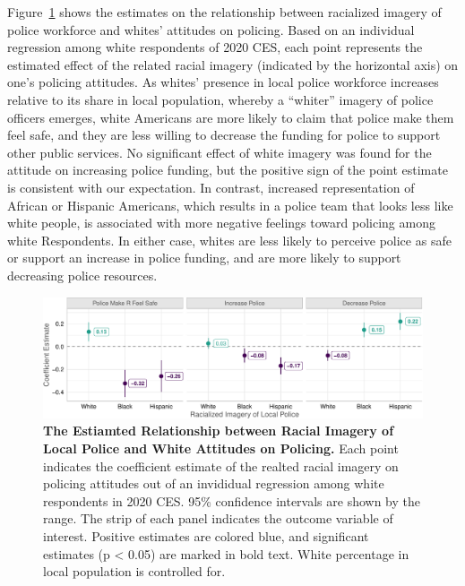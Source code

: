 \documentclass[
  12pt,
]{article}
\begin{document}
Figure~\ref{fig-baseline} shows the estimates on the relationship
between racialized imagery of police workforce and whites' attitudes on
policing. Based on an individual regression among white respondents of
2020 CES, each point represents the estimated effect of the related
racial imagery (indicated by the horizontal axis) on one's policing
attitudes. As whites' presence in local police workforce increases
relative to its share in local population, whereby a ``whiter'' imagery
of police officers emerges, white Americans are more likely to claim
that police make them feel safe, and they are less willing to decrease
the funding for police to support other public services. No significant
effect of white imagery was found for the attitude on increasing police
funding, but the positive sign of the point estimate is consistent with
our expectation. In contrast, increased representation of African or
Hispanic Americans, which results in a police team that looks less like
white people, is associated with more negative feelings toward policing
among white Respondents. In either case, whites are less likely to
perceive police as safe or support an increase in police funding, and
are more likely to support decreasing police resources.

\begin{figure}[t]

{\centering \includegraphics{racialized-police_files/figure-pdf/fig-baseline-1.pdf}

}

\caption{\label{fig-baseline}\textbf{The Estiamted Relationship between
Racial Imagery of Local Police and White Attitudes on Policing.} Each
point indicates the coefficient estimate of the realted racial imagery
on policing attitudes out of an invididual regression among white
respondents in 2020 CES. 95\% confidence intervals are shown by the
range. The strip of each panel indicates the outcome variable of
interest. Positive estimates are colored blue, and significant estimates
(p \textless{} 0.05) are marked in bold text. White percentage in local
population is controlled for.}

\end{figure}
\end{document}
